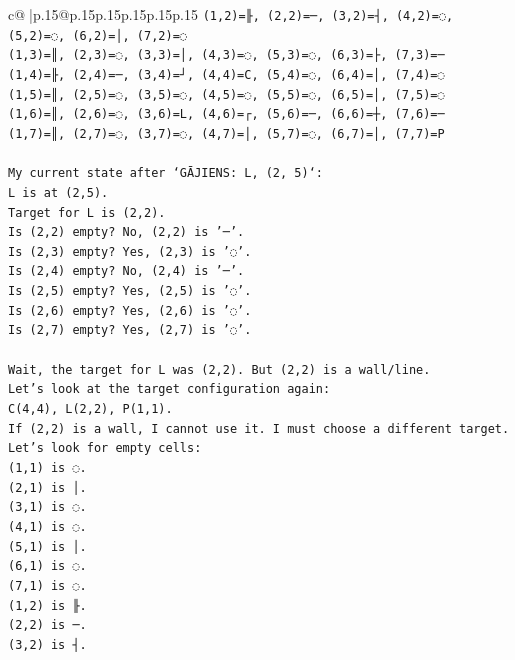 \documentclass{article}
\begin{document}
{\begin{supertabular}{c@{$\;$}|p{.15\linewidth}@{}p{.15\linewidth}p{.15\linewidth}p{.15\linewidth}p{.15\linewidth}p{.15\linewidth}}
{{{\texttt{(1,2)=╟, (2,2)=─, (3,2)=┤, (4,2)=◌, (5,2)=◌, (6,2)=│, (7,2)=◌} \\
\texttt{(1,3)=║, (2,3)=◌, (3,3)=│, (4,3)=◌, (5,3)=◌, (6,3)=├, (7,3)=─} \\
\texttt{(1,4)=╟, (2,4)=─, (3,4)=┘, (4,4)=C, (5,4)=◌, (6,4)=│, (7,4)=◌} \\
\texttt{(1,5)=║, (2,5)=◌, (3,5)=◌, (4,5)=◌, (5,5)=◌, (6,5)=│, (7,5)=◌} \\
\texttt{(1,6)=║, (2,6)=◌, (3,6)=L, (4,6)=┌, (5,6)=─, (6,6)=┼, (7,6)=─} \\
\texttt{(1,7)=║, (2,7)=◌, (3,7)=◌, (4,7)=│, (5,7)=◌, (6,7)=│, (7,7)=P} \\
\\ 
\texttt{My current state after `GĀJIENS: L, (2, 5)`:} \\
\texttt{L is at (2,5).} \\
\texttt{Target for L is (2,2).} \\
\texttt{Is (2,2) empty? No, (2,2) is '─'.} \\
\texttt{Is (2,3) empty? Yes, (2,3) is '◌'.} \\
\texttt{Is (2,4) empty? No, (2,4) is '─'.} \\
\texttt{Is (2,5) empty? Yes, (2,5) is '◌'.} \\
\texttt{Is (2,6) empty? Yes, (2,6) is '◌'.} \\
\texttt{Is (2,7) empty? Yes, (2,7) is '◌'.} \\
\\ 
\texttt{Wait, the target for L was (2,2). But (2,2) is a wall/line.} \\
\texttt{Let's look at the target configuration again:} \\
\texttt{C(4,4), L(2,2), P(1,1).} \\
\texttt{If (2,2) is a wall, I cannot use it. I must choose a different target.} \\
\texttt{Let's look for empty cells:} \\
\texttt{(1,1) is ◌.} \\
\texttt{(2,1) is │.} \\
\texttt{(3,1) is ◌.} \\
\texttt{(4,1) is ◌.} \\
\texttt{(5,1) is │.} \\
\texttt{(6,1) is ◌.} \\
\texttt{(7,1) is ◌.} \\
\texttt{(1,2) is ╟.} \\
\texttt{(2,2) is ─.} \\
\texttt{(3,2) is ┤.} \\
}}}
\end{supertabular}}
\end{document}

